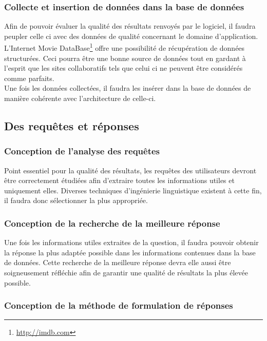 \documentclass[11pt]{article}
\begin{document}
\subsubsection{Collecte et insertion de données dans la base de données}
Afin de pouvoir évaluer la qualité des résultats renvoyés par le logiciel, il faudra peupler celle ci avec des données de qualité concernant le domaine d'application.
L'Internet Movie DataBase\footnote{\url{http://imdb.com}} offre une possibilité de récupération de données structurées.
Ceci pourra être une bonne source de données tout en gardant à l'esprit que les sites collaboratifs tels que celui ci ne peuvent être considérés comme parfaits. \\

Une fois les données collectées, il faudra les insérer dans la base de données de manière cohérente avec l'architecture de celle-ci.
\subsection{Des requêtes et réponses}
\subsubsection{Conception de l'analyse des requêtes}
Point essentiel pour la qualité des résultats, les requêtes des utilisateurs devront être correctement étudiées afin d'extraire toutes les informations utiles et uniquement elles.
Diverses techniques d'ingénierie linguistique existent à cette fin, il faudra donc sélectionner la plus appropriée. 
\subsubsection{Conception de la recherche de la meilleure réponse}
Une fois les informations utiles extraites de la question, il faudra pouvoir obtenir la réponse la plus adaptée possible dans les informations contenues dans la base de données.
Cette recherche de la meilleure réponse devra elle aussi être soigneusement réfléchie afin de garantir une qualité de résultats la plus élevée possible.
\subsubsection{Conception de la méthode de formulation de réponses}
\end{document}
